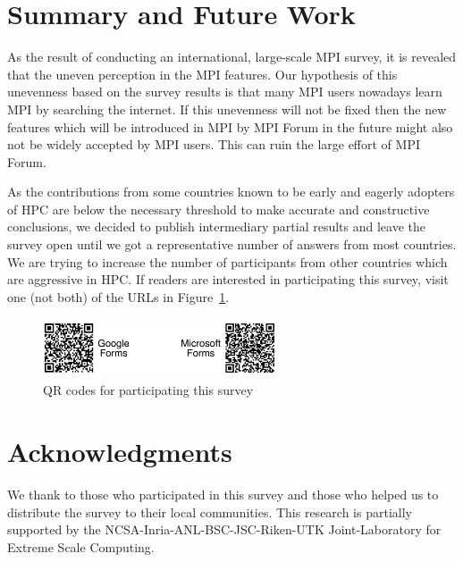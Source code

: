 \documentclass[sigconf,nonacm]{acmart}
\begin{document}
\section{Summary and Future Work}

As the result of conducting an international, large-scale MPI survey,
it is revealed that the uneven perception in the MPI features. Our
hypothesis of this unevenness based on the survey results is that many
MPI users nowadays learn MPI by searching the internet. If this
unevenness will not be fixed then the new features which will be
introduced in MPI by MPI Forum in the future might also not be
widely accepted by MPI users. This can ruin the large effort of MPI
Forum.

As the contributions from some countries known to be early and eagerly adopters
of HPC are below the necessary threshold to make accurate and constructive
conclusions, we decided to publish intermediary partial results and leave the
survey open until we got a representative number of answers from most countries.
%
We are trying to increase the number of participants from other
countries which are aggressive in HPC.
If readers are interested in participating this survey,
visit one (not both) of the URLs in
Figure~\ref{fig:qrcodes}.

\begin{figure}[htb]
\begin{center}
\includegraphics[width=7cm]{figs/QR-codes.pdf}
\vspace{-3mm}
\caption{QR codes for participating this survey}
\label{fig:qrcodes}
\end{center}
\vspace{-5mm}
\end{figure}

\section*{Acknowledgments}
{\small
We thank to those who participated in this survey and those who
helped us to distribute the survey to their local communities.
This research is partially supported by the
NCSA-Inria-ANL-BSC-JSC-Riken-UTK Joint-Laboratory for Extreme Scale
Computing\cite{JLESC}.
}


\end{document}
